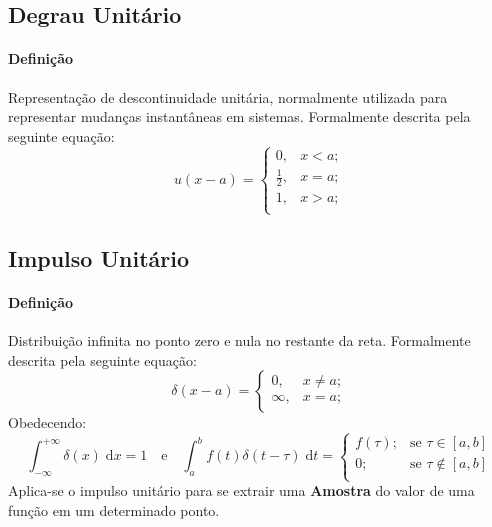 \documentclass{article}
\begin{document}
\subsection{Degrau Unitário}
    \paragraph{Definição}Representação de descontinuidade unitária, normalmente utilizada para representar mudanças instantâneas em sistemas. Formalmente descrita pela seguinte equação:
    \begin{equation}
        \boxed{
            u(x - a) = 
            \begin{cases}
                0, & x < a;\\
                \frac{1}{2}, & x = a;\\
                1, & x > a;\\
            \end{cases}
        }
    \end{equation}

\subsection{Impulso Unitário}
    \paragraph{Definição}Distribuição infinita no ponto zero e nula no restante da reta. Formalmente descrita pela seguinte equação:
    \begin{equation}
        \boxed{
            \delta(x-a) = 
            \begin{cases}
                0, & x \neq a;\\
                \infty, & x = a;\\
            \end{cases}
            }
        \end{equation}
    Obedecendo:
    \begin{equation*}
        \int_{-\infty}^{+\infty} \delta(x) \; \text{d}x = 1
        \quad\text{e}\quad
        \boxed{
            \int_{a}^{b} f(t) \delta(t - \tau)\;\text{d}t = 
            \begin{cases}
                f(\tau);    & \text{se } \tau\in[a,b]\\
                0;          & \text{se } \tau\notin[a,b]\\
            \end{cases}
        }
    \end{equation*}
    Aplica-se o impulso unitário para se extrair uma \textbf{Amostra} do valor de uma função em um determinado ponto.
\end{document}
